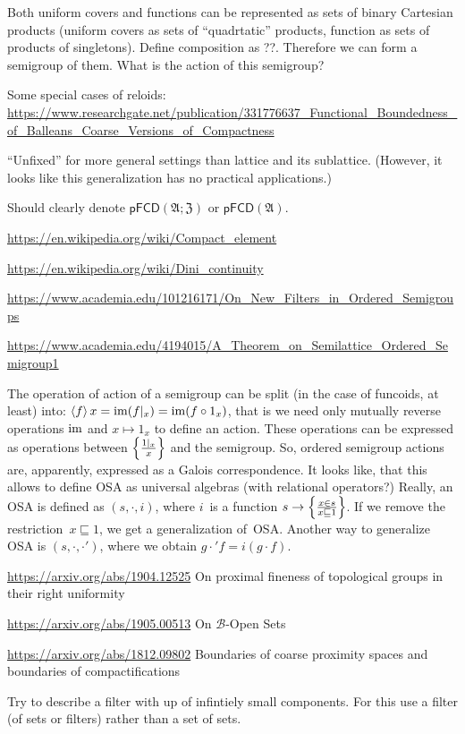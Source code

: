 \documentclass{amsart}
\begin{document}
Both uniform covers and functions can be represented as sets of binary Cartesian products
(uniform covers as sets of ``quadrtatic'' products, function as sets of products of singletons).
Define composition as ??.
Therefore we can form a semigroup of them. What is the action of this semigroup?

Some special cases of reloids:
\url{https://www.researchgate.net/publication/331776637_Functional_Boundedness_of_Balleans_Coarse_Versions_of_Compactness}

``Unfixed'' for more general settings than lattice and its
sublattice. (However, it looks like this generalization has
no practical applications.)

Should clearly denote $\mathsf{pFCD}(\mathfrak{A};\mathfrak{Z})$ or $\mathsf{pFCD}(\mathfrak{A})$.

\url{https://en.wikipedia.org/wiki/Compact_element}

\url{https://en.wikipedia.org/wiki/Dini_continuity}

\url{https://www.academia.edu/101216171/On_New_Filters_in_Ordered_Semigroups}

\url{https://www.academia.edu/4194015/A_Theorem_on_Semilattice_Ordered_Semigroup1}

The operation of action of a semigroup can be split (in the case of funcoids, at least) into:
$\left\langle f\right\rangle x = \operatorname{im}(f|_x)= \operatorname{im}(f\circ 1_x)$, that is we need only mutually reverse operations
$\operatorname{im}$ and $x\mapsto 1_x$ to define an action.
These operations can be expressed as operations between $\left\{ \frac{1|_x}{x}\right\}$ and the semigroup.
So, ordered semigroup actions are, apparently, expressed as a Galois correspondence.
It looks like, that this allows to define OSA as universal algebras (with relational operators?)
Really, an OSA is defined as $(s,\cdot,i)$, where $i$~is a function $s\to\left\{ \frac{x\in s}{x\sqsubseteq 1}\right\}$.
If we remove the restriction~$x\sqsubseteq 1$, we get a generalization of~OSA.
Another way to generalize OSA is $(s,\cdot,\cdot')$, where we obtain $g\cdot'f=i(g\cdot f)$.

\url{https://arxiv.org/abs/1904.12525} On proximal fineness of topological groups in their right uniformity

\url{https://arxiv.org/abs/1905.00513}
On $\mathcal{B}$-Open Sets

\url{https://arxiv.org/abs/1812.09802} Boundaries of coarse proximity spaces and boundaries of compactifications

Try to describe a filter with up of infintiely small
components.
For this use a filter (of sets or filters) rather than a set
of sets.
\end{document}
